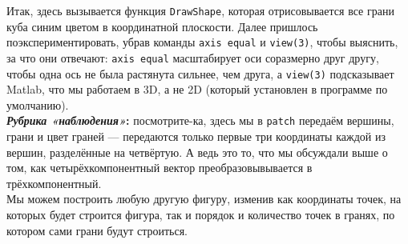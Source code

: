 \documentclass[a3paper,14pt]{extarticle}
\begin{document}
Итак, здесь вызывается функция \verb|DrawShape|, которая отрисовывается все грани куба синим цветом в координатной плоскости. Далее пришлось поэкспериментировать, убрав команды \verb|axis equal| и \verb|view(3)|, чтобы выяснить, за что они отвечают: \verb|axis equal| масштабирует оси соразмерно друг другу, чтобы одна ось не была растянута сильнее, чем друга, а \verb|view(3)| подсказывает Matlab, что мы работаем в 3D, а не 2D (который установлен в программе по умолчанию).\\[1em]
\textbf{\textit{Рубрика «наблюдения»}:} посмотрите-ка, здесь мы в \verb|patch| передаём вершины, грани и цвет граней --- передаются только первые три координаты каждой из вершин, разделённые на четвёртую. А ведь это то, что мы обсуждали выше о том, как четырёхкомпонентный вектор преобразовывывается в трёхкомпонентный.\\[1em]
Мы можем построить любую другую фигуру, изменив как координаты точек, на которых будет строится фигура, так и порядок и количество точек в гранях, по котором сами грани будут строиться.
\end{document}
